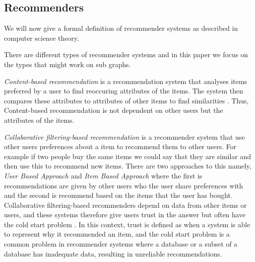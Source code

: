 \subsection{Recommenders}
\label{recommenders}
We will now give a formal definition of recommender systems as described in computer science theory.

There are different types of recommender systems and in this paper we focus on the types that might work on sub graphs.

\textit{Content-based recommendation} is a recommendation system that analyses items preferred by a user to find reoccuring attributes of the items. The system then compares these attributes to attributes of other items to find similarities \cite{lu2015recommender}. Thus, Content-based recommendation is not dependent on other users but the attributes of the items.

\textit{Collaborative filtering-based recommendation} is a recommender system that use other users preferences about a item to recommend them to other users. For example if two people buy the same items we could say that they are similar and then use this to recommend new items. There are two approaches to this namely, \textit{User Based Approach} and \textit{Item Based Approach} where the first is recommendations are given by other users who the user share preferences with and the second is recommend based on the items that the user has bought.
Collaborative filtering-based recommenders depend on data from other items or users, and these systems therefore give users trust in the answer but often have the cold start problem \cite{lu2015recommender}. In this context, trust is defined as when a system is able to represent why it recommended an item, and the cold start problem is a common problem in recommender systems where a database or a subset of a database has inadequate data, resulting in unreliable recommendations\cite{Ricci2015}.
